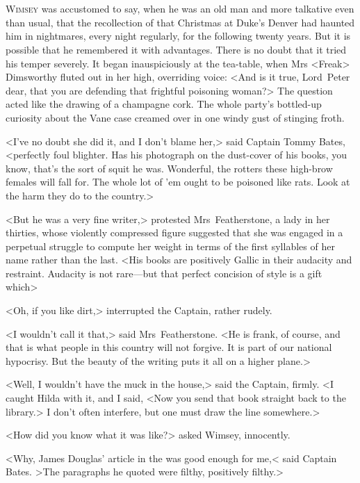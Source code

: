 \chapter[Chapter \thechapter]{}
\lettrine{W}{imsey} was accustomed to say, when he was an old man and more talkative even than usual, that the recollection of that Christmas at Duke's Denver had haunted him in nightmares, every night regularly, for the following twenty years. But it is possible that he remembered it with advantages. There is no doubt that it tried his temper severely. It began inauspiciously at the tea-table, when Mrs <Freak> Dimsworthy fluted out in her high, overriding voice: <And is it true, Lord~Peter dear, that you are defending that frightful poisoning woman?> The question acted like the drawing of a champagne cork. The whole party's bottled-up curiosity about the Vane case creamed over in one windy gust of stinging froth.

<I've no doubt she did it, and I don't blame her,> said Captain Tommy Bates, <perfectly foul blighter. Has his photograph on the dust-cover of his books, you know, that's the sort of squit he was. Wonderful, the rotters these high-brow females will fall for. The whole lot of 'em ought to be poisoned like rats. Look at the harm they do to the country.>

<But he was a very fine writer,> protested Mrs~Featherstone, a lady in her thirties, whose violently compressed figure suggested that she was engaged in a perpetual struggle to compute her weight in terms of the first syllables of her name rather than the last. <His books are positively Gallic in their audacity and restraint. Audacity is not rare—but that perfect concision of style is a gift which\longdash>

<Oh, if you like dirt,> interrupted the Captain, rather rudely.

<I wouldn't call it that,> said Mrs~Featherstone. <He is frank, of course, and that is what people in this country will not forgive. It is part of our national hypocrisy. But the beauty of the writing puts it all on a higher plane.>

<Well, I wouldn't have the muck in the house,> said the Captain, firmly. <I caught Hilda with it, and I said, <Now you send that book straight back to the library.> I don't often interfere, but one must draw the line somewhere.>

<How did you know what it was like?> asked Wimsey, innocently.

<Why, James Douglas' article in the  was good enough for me,< said Captain Bates. >The paragraphs he quoted were filthy, positively filthy.>

